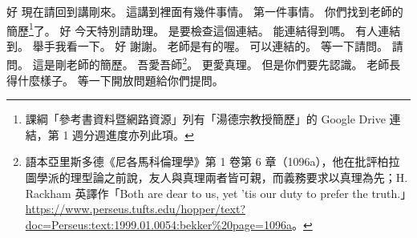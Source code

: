 \hypertarget{c01:cue:429}{}好 現在請回到講剛來。
\hypertarget{c01:cue:430}{}這講到裡面有幾件事情。
\hypertarget{c01:cue:431}{}第一件事情。
\hypertarget{c01:cue:432}{}你們找到老師的簡歷\footnote{課綱「參考書資料暨網路資源」列有「湯德宗教授簡歷」的 Google Drive 連結，第 1 週分週進度亦列此項。}了。
\hypertarget{c01:cue:433}{}好 今天特別請助理。
\hypertarget{c01:cue:434}{}是要檢查這個連結。
\hypertarget{c01:cue:435}{}能連結得到嗎。
\hypertarget{c01:cue:436}{}有人連結到。
\hypertarget{c01:cue:437}{}舉手我看一下。
\hypertarget{c01:cue:438}{}好 謝謝。
\hypertarget{c01:cue:439}{}老師是有的喔。
\hypertarget{c01:cue:440}{}可以連結的。
\hypertarget{c01:cue:441}{}等一下請問。
\hypertarget{c01:cue:442}{}請問。
\hypertarget{c01:cue:443}{}這是剛老師的簡歷。
\hypertarget{c01:cue:444}{}吾愛吾師\footnote{語本亞里斯多德《尼各馬科倫理學》第 1 卷第 6 章（1096a），他在批評柏拉圖學派的理型論之前說，友人與真理兩者皆可親，而義務要求以真理為先；H. Rackham 英譯作「Both are dear to us, yet 'tis our duty to prefer the truth.」\url{https://www.perseus.tufts.edu/hopper/text?doc=Perseus:text:1999.01.0054:bekker\%20page=1096a}。}。
\hypertarget{c01:cue:445}{}更愛真理。
\hypertarget{c01:cue:446}{}但是你們要先認識。
\hypertarget{c01:cue:447}{}老師長得什麼樣子。
\hypertarget{c01:cue:448}{}等一下開放問題給你們提問。

